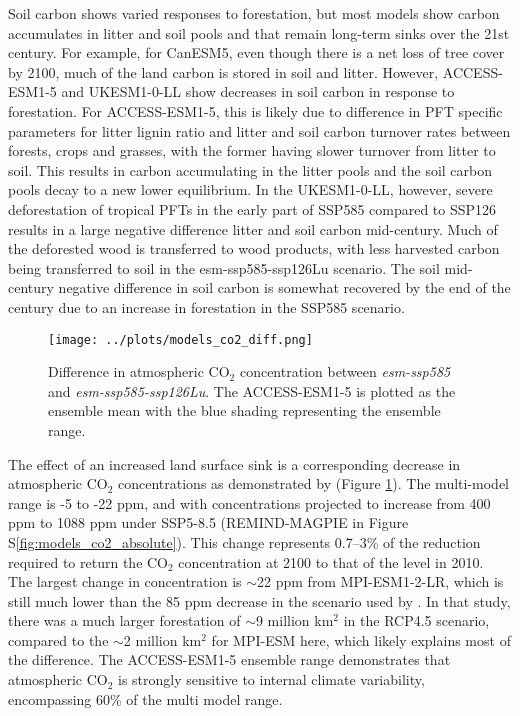 \documentclass[]{article}
\begin{document}
Soil carbon shows varied responses to forestation, but most models show carbon accumulates in litter and soil pools and that remain long-term sinks over the 21st century.
For example, for CanESM5, even though there is a net loss of tree cover by 2100, much of the land carbon is stored in soil and litter.
However, ACCESS-ESM1-5 and UKESM1-0-LL show decreases in soil carbon in response to forestation.
For ACCESS-ESM1-5, this is likely due to difference in PFT specific parameters for litter lignin ratio and litter and soil carbon turnover rates between forests, crops and grasses, with the former having slower turnover from litter to soil.
This results in carbon accumulating in the litter pools and the soil carbon pools decay to a new lower equilibrium.
In the UKESM1-0-LL, however, severe deforestation of tropical PFTs in the early part of SSP585 compared to SSP126 results in a large negative difference litter and soil carbon mid-century.
Much of the deforested wood is transferred to wood products, with less harvested carbon being transferred to soil in the esm-ssp585-ssp126Lu scenario.
The soil mid-century negative difference in soil carbon is somewhat recovered
by the end of the century due to an increase in forestation in the SSP585 scenario.

\begin{figure}
    \centering
    \texttt{[image: ../plots/models\_co2\_diff.png]}
    \caption{Difference in atmospheric CO$_2$ concentration between \textit{esm-ssp585} and \textit{esm-ssp585-ssp126Lu}. The ACCESS-ESM1-5 is plotted as the ensemble mean with the blue shading representing the ensemble range.}
    \label{fig:models_CO2}
\end{figure}

The effect of an increased land surface sink is a corresponding decrease in atmospheric CO$_2$ concentrations as demonstrated by (Figure \ref{fig:models_CO2}).
The multi-model range is -5 to -22 ppm, and with concentrations projected to increase from 400 ppm to 1088 ppm under SSP5-8.5 (REMIND-MAGPIE in Figure S\ref{fig:models_co2_absolute}).
This change represents 0.7–3\% of the reduction required to return the CO$_2$ concentration at 2100 to that of the level in 2010.
The largest change in concentration is $\sim$22 ppm from MPI-ESM1-2-LR, which is still much lower than the 85 ppm decrease in the scenario used by \cite{sonntag_reforestation_2016}.
In that study, there was a much larger forestation of $\sim$9 million km$^2$ in the RCP4.5 scenario, compared to the $\sim$2 million km$^2$ for MPI-ESM here, which likely explains most of the difference.
The ACCESS-ESM1-5 ensemble range demonstrates that atmospheric CO$_2$ is strongly sensitive to internal climate variability, encompassing 60\% of the multi model range.
\end{document}
